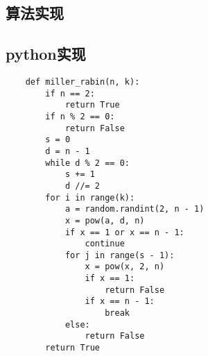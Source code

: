 \documentclass[a4paper]{article}
\begin{document}
\subsection{算法实现}
\subsection{python实现}
\begin{verbatim}
    def miller_rabin(n, k):
        if n == 2:
            return True
        if n % 2 == 0:
            return False
        s = 0
        d = n - 1
        while d % 2 == 0:
            s += 1
            d //= 2
        for i in range(k):
            a = random.randint(2, n - 1)
            x = pow(a, d, n)
            if x == 1 or x == n - 1:
                continue
            for j in range(s - 1):
                x = pow(x, 2, n)
                if x == 1:
                    return False
                if x == n - 1:
                    break
            else:
                return False
        return True
\end{verbatim}
\section{}
\end{document}
